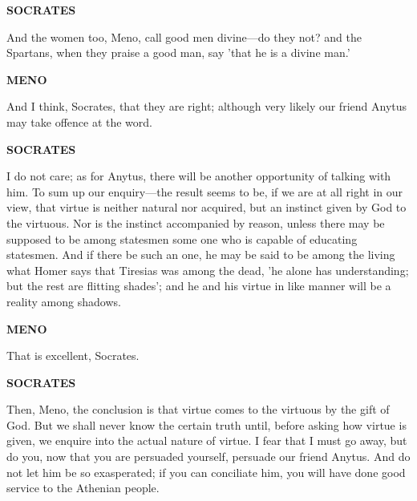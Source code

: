 \documentclass[11pt,letter]{article}
\begin{document}
\par \textbf{SOCRATES}
\par   And the women too, Meno, call good men divine—do they not? and the Spartans, when they praise a good man, say 'that he is a divine man.'

\par \textbf{MENO}
\par   And I think, Socrates, that they are right; although very likely our friend Anytus may take offence at the word.

\par \textbf{SOCRATES}
\par   I do not care; as for Anytus, there will be another opportunity of talking with him. To sum up our enquiry—the result seems to be, if we are at all right in our view, that virtue is neither natural nor acquired, but an instinct given by God to the virtuous. Nor is the instinct accompanied by reason, unless there may be supposed to be among statesmen some one who is capable of educating statesmen. And if there be such an one, he may be said to be among the living what Homer says that Tiresias was among the dead, 'he alone has understanding; but the rest are flitting shades'; and he and his virtue in like manner will be a reality among shadows.

\par \textbf{MENO}
\par   That is excellent, Socrates.

\par \textbf{SOCRATES}
\par   Then, Meno, the conclusion is that virtue comes to the virtuous by the gift of God. But we shall never know the certain truth until, before asking how virtue is given, we enquire into the actual nature of virtue. I fear that I must go away, but do you, now that you are persuaded yourself, persuade our friend Anytus. And do not let him be so exasperated; if you can conciliate him, you will have done good service to the Athenian people.

\par 
 
\end{document}
